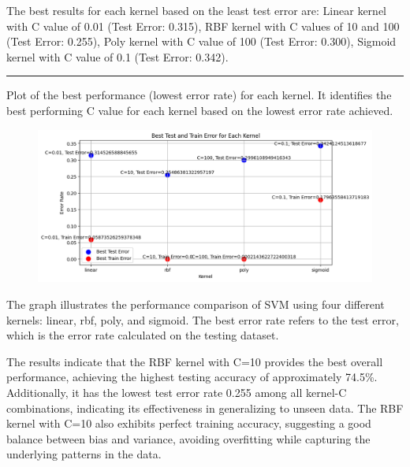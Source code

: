 \documentclass[a4paper,10 pt]{article}
\begin{document}
  The best results for each kernel based on the least test error are: Linear kernel with C value of 0.01 (Test Error: 0.315), RBF kernel with C values of 10 and 100 (Test Error: 0.255), Poly kernel with C value of 100 (Test Error: 0.300), Sigmoid kernel with C value of 0.1 (Test Error: 0.342).

    
  \vspace{12pt}

  
  \hrule 
  \vspace{12pt}
    
  Plot of the best performance (lowest error rate) for each kernel. It identifies the best performing C value for each kernel based on the lowest error rate achieved.

  \begin{figure}[htbp]
    \centering
    \includegraphics[width=1\textwidth]{graphQ5er.png} %
    
  \end{figure}


  \vspace{12pt}


  The graph illustrates the performance comparison of SVM using four different kernels: linear, rbf, poly, and sigmoid. The best error rate refers to the test error, which is the error rate calculated on the testing dataset. 
  
  \vspace{12pt}

  The results indicate that the RBF kernel with C=10 provides the best overall performance, achieving the highest testing accuracy of approximately 74.5\%. Additionally, it has the lowest test error rate 0.255 among all kernel-C combinations, indicating its effectiveness in generalizing to unseen data. The RBF kernel with C=10 also exhibits perfect training accuracy, suggesting a good balance between bias and variance, avoiding overfitting while capturing the underlying patterns in the data.
\end{document}
